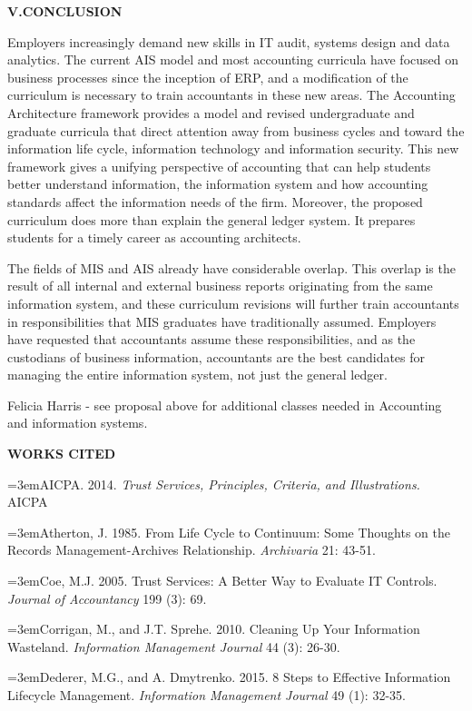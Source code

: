 \documentclass[12pt]{article}
\newcommand{\Section}[2]{\vspace{.2in}\centerline{\normalsize{}\textbf{#1\quad{}\MakeUppercase{#2}}}\nopagebreak{}\smallskip{}\indent{}}
\newcommand{\Reference}[1]{\parindent=0pt\hangindent=3em\hangafter=1#1\vspace{.15in}}
\begin{document}
\Section{V.}{Conclusion}
Employers increasingly demand new skills in IT audit, systems design and data analytics. The current AIS model and most accounting curricula have focused on business processes since the inception of ERP, and a modification of the curriculum is necessary to train accountants in these new areas. The Accounting Architecture framework provides a model and revised undergraduate and graduate curricula that direct attention away from business cycles and toward the information life cycle, information technology and information security. This new framework gives a unifying perspective of accounting that can help students better understand information, the information system and how accounting standards affect the information needs of the firm. Moreover, the proposed curriculum does more than explain the general ledger system. It prepares students for a timely career as accounting architects.

The fields of MIS and AIS already have considerable overlap. This overlap is the result of all internal and external business reports originating from the same information system, and these curriculum revisions will further train accountants in responsibilities that MIS graduates have traditionally assumed. Employers have requested that accountants assume these responsibilities, and as the custodians of business information, accountants are the best candidates for managing the entire information system, not just the general ledger.

Felicia Harris - see proposal above for additional classes needed in Accounting and information systems.
\newpage{}

\centerline{\textbf{\MakeUppercase{Works Cited}}}
\smallskip{}
\singlespace{}
\Reference{AICPA. 2014. \emph{Trust Services, Principles, Criteria, and Illustrations.} AICPA}

\Reference{Atherton, J. 1985. From Life Cycle to Continuum: Some Thoughts on the Records Management-Archives Relationship. \emph{Archivaria} 21: 43-51.}

\Reference{Coe, M.J. 2005. Trust Services: A Better Way to Evaluate IT Controls. \emph{Journal of Accountancy} 199 (3): 69.}

\Reference{Corrigan, M., and J.T. Sprehe. 2010. Cleaning Up Your Information Wasteland. \emph{Information Management Journal} 44 (3): 26-30.}

\Reference{Dederer, M.G., and A. Dmytrenko. 2015. 8 Steps to Effective Information Lifecycle Management. \emph{Information Management Journal} 49 (1): 32-35.}
\end{document}
